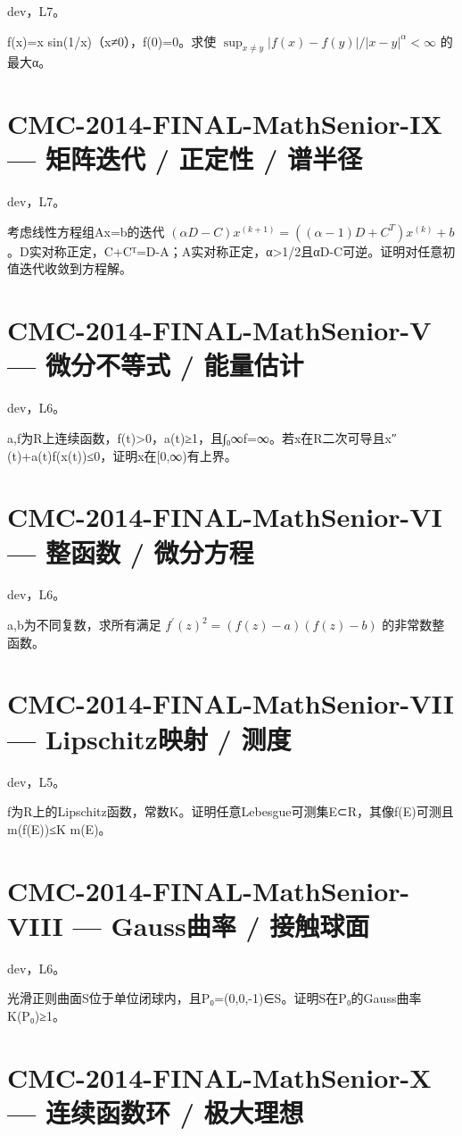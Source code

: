 \documentclass[UTF8]{ctexart}
\begin{document}
dev，L7。

f(x)=x sin(1/x)（x≠0），f(0)=0。求使 $\sup_{x\ne y}|f(x)-f(y)|/|x-y|^\alpha<\infty$ 的最大α。

\section*{CMC-2014-FINAL-MathSenior-IX — 矩阵迭代 / 正定性 / 谱半径}

dev，L7。

考虑线性方程组Ax=b的迭代 $(\alpha D-C)x^{(k+1)}=((\alpha-1)D+C^T)x^{(k)}+b$。D实对称正定，C+Cᵀ=D-A；A实对称正定，α>1/2且αD-C可逆。证明对任意初值迭代收敛到方程解。

\section*{CMC-2014-FINAL-MathSenior-V — 微分不等式 / 能量估计}

dev，L6。

a,f为R上连续函数，f(t)>0，a(t)≥1，且∫₀∞f=∞。若x在R二次可导且x″(t)+a(t)f(x(t))≤0，证明x在[0,∞)有上界。

\section*{CMC-2014-FINAL-MathSenior-VI — 整函数 / 微分方程}

dev，L6。

a,b为不同复数，求所有满足 $f^{\prime}(z)^2=(f(z)-a)(f(z)-b)$ 的非常数整函数。

\section*{CMC-2014-FINAL-MathSenior-VII — Lipschitz映射 / 测度}

dev，L5。

f为R上的Lipschitz函数，常数K。证明任意Lebesgue可测集E⊂R，其像f(E)可测且m(f(E))≤K m(E)。

\section*{CMC-2014-FINAL-MathSenior-VIII — Gauss曲率 / 接触球面}

dev，L6。

光滑正则曲面S位于单位闭球内，且P₀=(0,0,-1)∈S。证明S在P₀的Gauss曲率K(P₀)≥1。

\section*{CMC-2014-FINAL-MathSenior-X — 连续函数环 / 极大理想}
\end{document}
